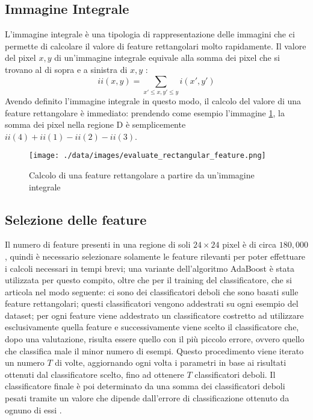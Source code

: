 \subsection{Immagine Integrale}
L'immagine integrale è una tipologia di rappresentazione delle immagini che ci permette di calcolare il valore di feature rettangolari molto rapidamente. Il valore del pixel $x,y$ di un'immagine integrale equivale alla somma dei pixel che si trovano al di sopra e a sinistra di $x,y$ \cite{viola2001rapid}:
\begin{equation}
	ii(x,y)=\sum_{x'\le{x},y'\le{y}}i(x',y') 
\end{equation}
Avendo definito l'immagine integrale in questo modo, il calcolo del valore di una feature rettangolare è immediato: prendendo come esempio l'immagine \ref{integral}, la somma dei pixel nella regione D è semplicemente $ii(4)+ii(1)-ii(2)-ii(3)$.
\begin{figure}
	\centering
	\texttt{[image: ./data/images/evaluate\_rectangular\_feature.png]}
	\caption{Calcolo di una feature rettangolare a partire da un'immagine integrale \cite{viola2001rapid}}
	\label{integral}
\end{figure}

\subsection{Selezione delle feature}
Il numero di feature presenti in una regione di soli $24\times24$ pixel è di circa $180,000$, quindi è necessario selezionare solamente le feature rilevanti per poter effettuare i calcoli necessari in tempi brevi; una variante dell'algoritmo AdaBoost è stata utilizzata per questo compito, oltre che per il training del classificatore, che si articola nel modo seguente: ci sono dei classificatori deboli che sono basati sulle feature rettangolari; questi classificatori vengono addestrati su ogni esempio del dataset; per ogni feature viene addestrato un classificatore costretto ad utilizzare esclusivamente quella feature e successivamente viene scelto il classificatore che, dopo una valutazione, risulta essere quello con il più piccolo errore, ovvero quello che classifica male il minor numero di esempi. Questo procedimento viene iterato un numero $T$ di volte, aggiornando ogni volta i parametri in base ai risultati ottenuti dal classificatore scelto, fino ad ottenere $T$ classificatori deboli. Il classificatore finale è poi determinato da una somma dei classificatori deboli pesati tramite un valore che dipende dall'errore di classificazione ottenuto da ognuno di essi \cite{viola2001rapid}.

